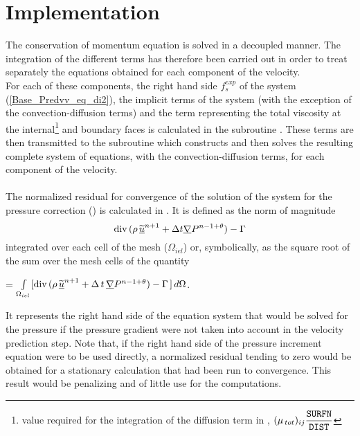 \section*{Implementation}

The conservation of momentum equation is solved in a decoupled manner. The integration of the different terms has therefore been carried out in order to treat separately the equations obtained for each component of the velocity.\\
For each of these components, the right hand side $f_s^{exp}$ of the system  (\ref{Base_Predvv_eq_di2}), the implicit terms of the system (with the exception of the convection-diffusion terms) and the term representing the total viscosity at the  internal\footnote{value required for the integration of the diffusion term in , $\displaystyle(\mu_{\,tot})_{ij}\frac{\text{\texttt{SURFN}}}{\text{\texttt{DIST}}}$} and boundary faces is calculated in the subroutine . These terms are then transmitted to the subroutine  which constructs and then solves the resulting complete system of equations, with the convection-diffusion terms, for each component of the velocity.
\\\\
The normalized residual for convergence of the solution of the system for the pressure correction () is calculated in
. It is defined as the norm of magnitude
  $$\text{div}\,(\rho\,\widetilde{\underline{u}}^{n+1}+\Delta t \underline{\nabla}{P^{n-1+\theta}})-\Gamma$$
integrated over each cell  of the mesh ($\Omega_{iel}$) or, symbolically, as the square root of the sum over the mesh cells of the quantity
\begin{center}
=
$\int\limits_{\Omega_{iel}}[{\text{div}\,(\rho\,\widetilde{\underline{u}}^{n+1}+\Delta\,t\,\underline{\nabla}{P^{n-1+\theta}})
-\Gamma\,]\,d\Omega}$.
\end{center}

It represents the right hand side of the equation system that would be solved for the pressure if the pressure gradient were not taken into account in the velocity prediction step. Note that, if the right hand side of the pressure increment equation were to be used directly, a normalized residual tending to zero would be obtained for a stationary calculation that had been run to convergence. This result would be penalizing and of little use for the computations.

